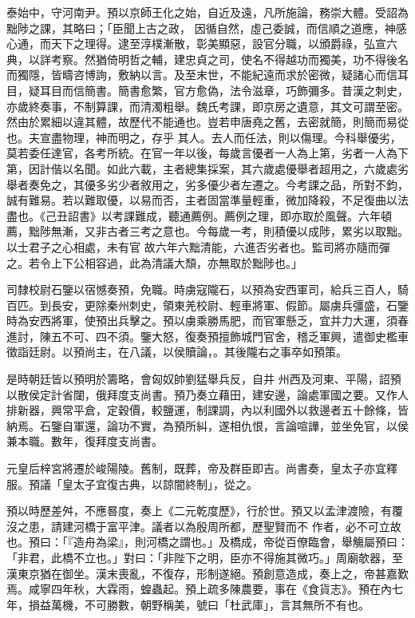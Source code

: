 \begin{pinyinscope}
 泰始中，守河南尹。預以京師王化之始，自近及遠，凡所施論，務崇大體。受詔為黜陟之課，其略曰；「臣聞上古之政，
 因循自然，虛己委誠，而信順之道應，神感心通，而天下之理得。逮至淳樸漸散，彰美顯惡，設官分職，以頒爵祿，弘宣六典，以詳考察。然猶倚明哲之輔，建忠貞之司，使名不得越功而獨美，功不得後名而獨隱，皆疇咨博詢，敷納以言。及至末世，不能紀遠而求於密微，疑諸心而信耳目，疑耳目而信簡書。簡書愈繁，官方愈偽，法令滋章，巧飾彌多。昔漢之刺史，亦歲終奏事，不制算課，而清濁粗舉。魏氏考課，即京房之遺意，其文可謂至密。然由於累細以違其體，故歷代不能通也。豈若申唐堯之舊，去密就簡，則簡而易從也。夫宣盡物理，神而明之，存乎
 其人。去人而任法，則以傷理。今科舉優劣，莫若委任達官，各考所統。在官一年以後，每歲言優者一人為上第，劣者一人為下第，因計偕以名聞。如此六載，主者總集採案，其六歲處優舉者超用之，六歲處劣舉者奏免之，其優多劣少者敘用之，劣多優少者左遷之。今考課之品，所對不鈞，誠有難易。若以難取優，以易而否，主者固當準量輕重，微加降殺，不足復曲以法盡也。《己丑詔書》以考課難成，聽通薦例。薦例之理，即亦取於風聲。六年頓薦，黜陟無漸，又非古者三考之意也。今每歲一考，則積優以成陟，累劣以取黜。以士君子之心相處，未有官
 故六年六黜清能，六進否劣者也。監司將亦隨而彈之。若令上下公相容過，此為清議大頹，亦無取於黜陟也。」



 司隸校尉石鑒以宿憾奏預，免職。時虜寇隴石，以預為安西軍司，給兵三百人，騎百匹。到長安，更除秦州刺史，領東羌校尉、輕車將軍、假節。屬虜兵彊盛，石鑒時為安西將軍，使預出兵擊之。預以虜乘勝馬肥，而官軍懸乏，宜并力大運，須春進討，陳五不可、四不須。鑒大怒，復奏預擅飾城門官舍，稽乏軍興，遣御史檻車徵詣廷尉。以預尚主，在八議，以侯贖論，。其後隴右之事卒如預策。



 是時朝廷皆以預明於籌略，會匈奴帥劉猛舉兵反，自并
 州西及河東、平陽，詔預以散侯定計省闥，俄拜度支尚書。預乃奏立藉田，建安邊，論處軍國之要。又作人排新器，興常平倉，定穀價，較鹽運，制課調，內以利國外以救邊者五十餘條，皆納焉。石鑒自軍還，論功不實，為預所糾，遂相仇恨，言論喧譁，並坐免官，以侯兼本職。數年，復拜度支尚書。



 元皇后梓宮將遷於峻陽陵。舊制，既葬，帝及群臣即吉。尚書奏，皇太子亦宜釋服。預議「皇太子宜復古典，以諒闇終制」，從之。



 預以時歷差舛，不應晷度，奏上《二元乾度歷》，行於世。預又以孟津渡險，有覆沒之患，請建河橋于富平津。議者以為殷周所都，歷聖賢而不
 作者，必不可立故也。預曰：「『造舟為梁』，則河橋之謂也。」及橋成，帝從百僚臨會，舉觴屬預曰：「非君，此橋不立也。」對曰：「非陛下之明，臣亦不得施其微巧。」周廟欹器，至漢東京猶在御坐。漢末喪亂，不復存，形制遂絕。預創意造成，奏上之，帝甚嘉歎焉。咸寧四年秋，大霖雨，蝗蟲起。預上疏多陳農要，事在《食貨志》。預在內七年，損益萬機，不可勝數，朝野稱美，號曰「杜武庫」，言其無所不有也。




\end{pinyinscope}

